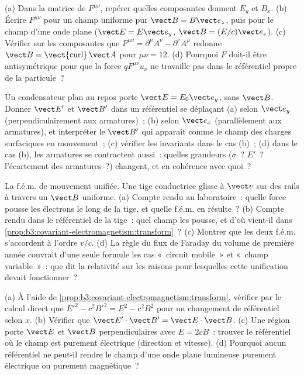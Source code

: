 \begin{exercise}[$\star$]\label{exo:b3:covariant-electromagnetism:3}
(a) Dans la matrice de $F^{\mu\nu}$, repérer quelles composantes
donnent $E_y$ et $B_x$. (b) Écrire $F^{\mu\nu}$ pour un champ
uniforme pur $\vect B = B\vect e_z$, puis pour le champ d'une onde
plane ($\vect E = E\vect e_y$, $\vect B = (E/c)\vect e_z$). (c)
Vérifier sur les composantes que $F^{\mu\nu} = \partial^\mu A^\nu - \partial^\nu
A^\mu$ redonne $\vect B = \operatorname{\vect{curl}}\vect A$ pour
$\mu\nu = 12$. (d) Pourquoi $F$ doit-il être antisymétrique pour que la
force $qF^{\mu\nu}u_\nu$ ne travaille pas dans le référentiel propre de
la particule~?
\end{exercise}

\begin{exercise}[$\star$]\label{exo:b3:covariant-electromagnetism:4}
Un condensateur plan au repos porte $\vect E = E_0\vect e_y$, sans
$\vect B$. Donner $\vect E'$ et $\vect B'$ dans un référentiel se
déplaçant (a) selon $\vect e_y$ (perpendiculairement aux armatures)~;
(b) selon $\vect
e_x$ (parallèlement aux armatures), et interpréter le $\vect B'$ qui
apparaît comme le champ des charges surfaciques en mouvement~; (c)
vérifier les invariants dans le cas (b)~; (d) dans le cas (b), les
armatures se contractent aussi~: quelles grandeurs ($\sigma$~? $E'$~?
l'écartement des armatures~?) changent, et en cohérence avec quoi~?
\end{exercise}

\begin{exercise}[$\star\star$]\label{exo:b3:covariant-electromagnetism:5}
La f.é.m. de mouvement unifiée. Une tige conductrice glisse à $\vect v$
sur des rails à travers un $\vect B$ uniforme. (a) Compte rendu au
laboratoire~: quelle force pousse les électrons le long de la tige, et
quelle f.é.m. en résulte~? (b) Compte rendu dans le référentiel de la
tige~: quel champ les pousse, et d'où vient-il dans
\cref{prop:b3:covariant-electromagnetism:transform}~? (c) Montrer que
les deux f.é.m. s'accordent à l'ordre $v/c$. (d) La règle du flux de
Faraday du volume de première année couvrait d'une seule formule les
cas «~circuit mobile~» et «~champ variable~»~: que dit la relativité
sur les raisons pour lesquelles cette unification devait fonctionner~?
\end{exercise}

\begin{exercise}[$\star\star$]\label{exo:b3:covariant-electromagnetism:6}
(a) À l'aide de \cref{prop:b3:covariant-electromagnetism:transform},
vérifier par le calcul direct que $E'^2 - c^2B'^2 = E^2 - c^2B^2$ pour
un changement de référentiel selon $x$. (b) Vérifier que $\vect E'\cdot\vect B' = \vect
E\cdot\vect B$. (c) Une région porte $\vect E$ et $\vect B$
perpendiculaires avec $E = 2cB$~: trouver le référentiel où le champ
est purement électrique (direction et vitesse). (d) Pourquoi aucun
référentiel ne peut-il rendre le champ d'une onde plane lumineuse
purement électrique ou purement magnétique~?
\end{exercise}

